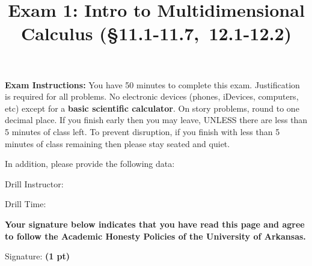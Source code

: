 \documentclass[12pt, addpoints]{exam/exam}
\title{\vspace{-8pc}
\vfill{\Huge
	\bf Exam 1: Intro to Multidimensional Calculus (\S 11.1-11.7,\ 12.1-12.2)} 
	}
\date{}
\theoremstyle{plain}
\begin{document}
\begin{coverpages}
\maketitle
\thispagestyle{headandfoot}
\vspace{-4pc}
{\bf Exam Instructions:} You have 50 minutes to complete this exam.  Justification is required for all problems.  %
No electronic devices (phones, iDevices, computers, etc) except for a \textbf{basic scientific calculator}.  On story problems, round to one decimal place. If you finish early then you may leave, UNLESS there are less than 5 minutes of class left.  To prevent disruption, if you finish with less than 5 minutes of class remaining then please stay seated and quiet.

\begin{flushright}
In addition, please provide the following data:

\vspace{0.3in}
Drill Instructor: \underline{\hspace{40ex}}

\vspace{0.3in}
Drill Time: \underline{\hspace{40ex}}
\end{flushright}

\vfill
\textbf{Your signature below indicates that you have read this page and agree to follow the Academic Honesty Policies of the University of Arkansas.}  

\vspace{0.3in}
Signature: {\bf (1 pt)} \underline{\hspace{73ex}}

\newpage

\begin{center}
\vspace*{\fill}
\vspace*{\fill}
\end{center}
\end{coverpages}
\end{document}
